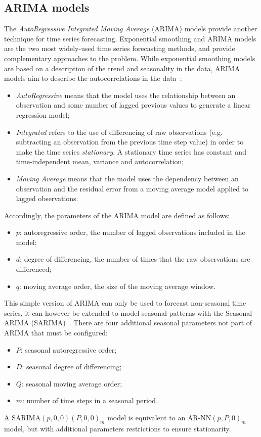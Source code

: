 \subsection{ARIMA models}
\label{subsec:arima_models}
The \emph{AutoRegressive Integrated Moving Average} (ARIMA) models provide another technique for time series forecasting. Exponential smoothing and ARIMA models are the two most widely-used time series forecasting methods, and provide complementary approaches to the problem. While exponential smoothing models are based on a description of the trend and seasonality in the data, ARIMA models aim to describe the autocorrelations in the data~\cite{jenkins}:
\begin{itemize}
  \item \emph{AutoRegressive} means that the model uses the relationship between an observation and some number of lagged previous values to generate a linear regression model;
  \item \emph{Integrated} refers to the use of differencing of raw observations (e.g. subtracting an observation from the previous time step value) in order to make the time series \emph{stationary}. A stationary time series has constant and time-independent mean, variance and autocorrelation;
  \item \emph{Moving Average} means that the model uses the dependency between an observation and the residual error from a moving average model applied to lagged observations.
\end{itemize}
Accordingly, the parameters of the ARIMA model are defined as follows:
\begin{itemize}
  \item \( p \): autoregressive order, the number of lagged observations included in the model;
  \item \( d \): degree of differencing, the number of times that the raw observations are differenced;
  \item \( q \): moving average order, the size of the moving average window.
\end{itemize}
This simple version of ARIMA can only be used to forecast non-seasonal time series, it can however be extended to model seasonal patterns with the Seasonal ARIMA (SARIMA)~\cite{hyndman2018}. There are four additional seasonal parameters not part of ARIMA that must be configured:
\begin{itemize}
  \item \( P \): seasonal autoregressive order;
  \item \( D \): seasonal degree of differencing;
  \item \( Q \): seasonal moving average order;
  \item \( m \): number of time steps in a seasonal period.
\end{itemize}
A \( \text{SARIMA}(p,0,0)(P,0,0)_m \) model is equivalent to an \( \text{AR-NN}(p,P,0)_m \) model, but with additional parameters restrictions to ensure stationarity.


